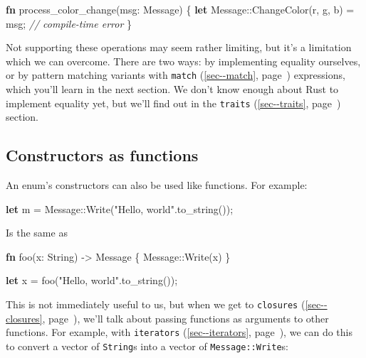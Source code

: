 \documentclass[a4paper,]{book}
\renewcommand*{\hyperref}[2][\ar]{%
  \def\ar{#2}%
  #2 (\autoref{#1}, page~\pageref{#1})}
\newenvironment{Shaded}{\begin{snugshade}}{\end{snugshade}}
\newcommand{\KeywordTok}[1]{\textcolor[rgb]{0.13,0.29,0.53}{\textbf{{#1}}}}
\newcommand{\DataTypeTok}[1]{\textcolor[rgb]{0.13,0.29,0.53}{{#1}}}
\newcommand{\StringTok}[1]{\textcolor[rgb]{0.31,0.60,0.02}{{#1}}}
\newcommand{\CommentTok}[1]{\textcolor[rgb]{0.56,0.35,0.01}{\textit{{#1}}}}
\newcommand{\NormalTok}[1]{{#1}}
\begin{document}
\begin{Shaded}
\begin{Highlighting}[]
\KeywordTok{fn} \NormalTok{process_color_change(msg: Message) \{}
    \KeywordTok{let} \NormalTok{Message::ChangeColor(r, g, b) = msg; }\CommentTok{// compile-time error}
\NormalTok{\}}
\end{Highlighting}
\end{Shaded}

Not supporting these operations may seem rather limiting, but it's a
limitation which we can overcome. There are two ways: by implementing
equality ourselves, or by pattern matching variants with
\hyperref[sec--match]{\texttt{match}} expressions, which you'll learn in
the next section. We don't know enough about Rust to implement equality
yet, but we'll find out in the \hyperref[sec--traits]{\texttt{traits}}
section.

\subsection{Constructors as functions}\label{constructors-as-functions}

An enum's constructors can also be used like functions. For example:

\begin{Shaded}
\begin{Highlighting}[]
\KeywordTok{let} \NormalTok{m = Message::Write(}\StringTok{"Hello, world"}\NormalTok{.to_string());}
\end{Highlighting}
\end{Shaded}

Is the same as

\begin{Shaded}
\begin{Highlighting}[]
\KeywordTok{fn} \NormalTok{foo(x: }\DataTypeTok{String}\NormalTok{) -> Message \{}
    \NormalTok{Message::Write(x)}
\NormalTok{\}}

\KeywordTok{let} \NormalTok{x = foo(}\StringTok{"Hello, world"}\NormalTok{.to_string());}
\end{Highlighting}
\end{Shaded}

This is not immediately useful to us, but when we get to
\hyperref[sec--closures]{\texttt{closures}}, we'll talk about passing
functions as arguments to other functions. For example, with
\hyperref[sec--iterators]{\texttt{iterators}}, we can do this to convert
a vector of \texttt{String}s into a vector of \texttt{Message::Write}s:
\end{document}
